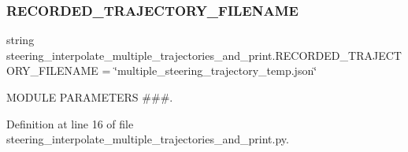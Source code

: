 \subsubsection{\texorpdfstring{RECORDED\_TRAJECTORY\_FILENAME}{RECORDED\_TRAJECTORY\_FILENAME}}
{\footnotesize\ttfamily string steering\+\_\+interpolate\+\_\+multiple\+\_\+trajectories\+\_\+and\+\_\+print.\+R\+E\+C\+O\+R\+D\+E\+D\+\_\+\+T\+R\+A\+J\+E\+C\+T\+O\+R\+Y\+\_\+\+F\+I\+L\+E\+N\+A\+ME = \char`\"{}multiple\+\_\+steering\+\_\+trajectory\+\_\+temp.\+json\char`\"{}}



M\+O\+D\+U\+LE P\+A\+R\+A\+M\+E\+T\+E\+RS \#\#\#. 



Definition at line 16 of file steering\+\_\+interpolate\+\_\+multiple\+\_\+trajectories\+\_\+and\+\_\+print.\+py.

